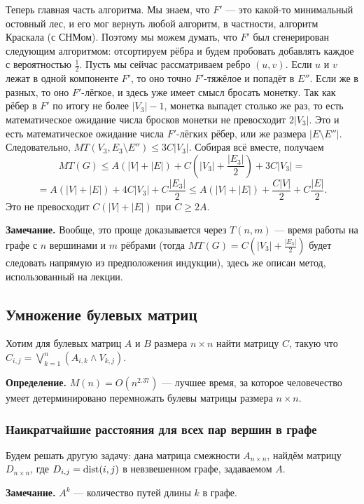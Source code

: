 Теперь главная часть алгоритма. Мы знаем, что $F'$ --- это какой-то минимальный остовный лес, и его мог вернуть любой алгоритм, в частности, алгоритм Краскала (с СНМом).
Поэтому мы можем думать, что $F'$ был сгенерирован следующим алгоритмом: отсортируем рёбра и будем пробовать добавлять каждое с вероятностью $\frac{1}{2}$.
Пусть мы сейчас рассматриваем ребро $(u, v)$.
Если $u$ и $v$ лежат в одной компоненте $F'$, то оно точно $F'$-тяжёлое и попадёт в $E''$.
Если же в разных, то оно $F'$-лёгкое, и здесь уже имеет смысл бросать монетку.
Так как рёбер в $F'$ по итогу не более $|V_3| - 1$, монетка выпадет столько же раз, то есть математическое ожидание числа бросков монетки не превосходит $2|V_3|$. 
Это и есть математическое ожидание числа $F'$-лёгких рёбер, или же размера $|E \setminus E''|$.
Следовательно, $MT(V_3, E_3 \setminus E'') \le 3C |V_3|$.
Собирая всё вместе, получаем
\[
    MT(G) \le A(|V| + |E|) + C \left(|V_3| + \frac{|E_3|}{2} \right) + 3C|V_3| = 
\]
\[
    = A(|V| + |E|) + 4C|V_3| + C \frac{|E_3|}{2} \le A(|V| + |E|) + \frac{C|V|}{2} + C \frac{|E|}{2}.
\]
Это не превосходит $C(|V| + |E|)$ при $C \ge 2A$.

\textbf{Замечание.} Вообще, это проще доказывается через $T(n, m)$ --- время работы на графе с $n$ вершинами и $m$ рёбрами (тогда $MT(G) = C \left( |V_3| + \frac{|E_3|}{2} \right)$ будет следовать напрямую из предположения индукции), здесь же описан метод, использованный на лекции.

\subsection{Умножение булевых матриц}
Хотим для булевых матриц $A$ и $B$ размера $n \times n$ найти матрицу $C$, такую что $C_{i,j} = \bigvee_{k=1}^n (A_{i,k} \wedge V_{k,j})$.

\textbf{Определение.} $M(n) = O(n^{2.37})$ --- лучшее время, за которое человечество умеет детерминировано перемножать булевы матрицы размера $n \times n$.

\subsubsection{Наикратчайшие расстояния для всех пар вершин в графе}
Будем решать другую задачу: дана матрица смежности $A_{n \times n}$, найдём матрицу $D_{n \times n}$, где $D_{i,j} = \operatorname{dist}(i, j)$ в невзвешенном графе, задаваемом $A$.

\textbf{Замечание.} $A^k$ --- количество путей длины $k$ в графе.


